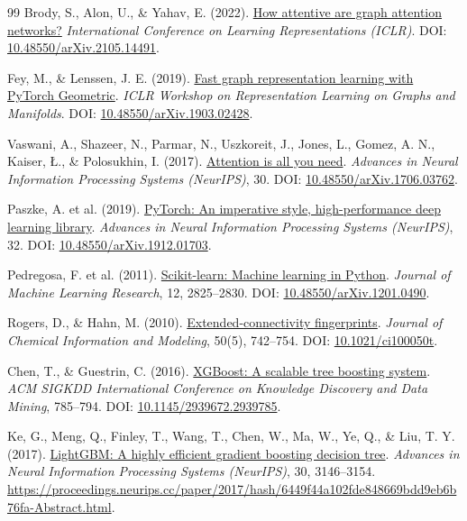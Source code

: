 \documentclass[11pt]{article}
\begin{document}
\begin{thebibliography}{99}
 Brody, S., Alon, U., \& Yahav, E. (2022). \href{https://openreview.net/forum?id=F72ximsx7C1}{How attentive are graph attention networks?} \textit{International Conference on Learning Representations (ICLR)}. DOI: \href{https://doi.org/10.48550/arXiv.2105.14491}{10.48550/arXiv.2105.14491}.

 Fey, M., \& Lenssen, J. E. (2019). \href{https://arxiv.org/abs/1903.02428}{Fast graph representation learning with PyTorch Geometric}. \textit{ICLR Workshop on Representation Learning on Graphs and Manifolds}. DOI: \href{https://doi.org/10.48550/arXiv.1903.02428}{10.48550/arXiv.1903.02428}.

 Vaswani, A., Shazeer, N., Parmar, N., Uszkoreit, J., Jones, L., Gomez, A. N., Kaiser, {\L}., \& Polosukhin, I. (2017). \href{https://proceedings.neurips.cc/paper/2017/hash/3f5ee243547dee91fbd053c1c4a845aa-Abstract.html}{Attention is all you need}. \textit{Advances in Neural Information Processing Systems (NeurIPS)}, 30. DOI: \href{https://doi.org/10.48550/arXiv.1706.03762}{10.48550/arXiv.1706.03762}.

 Paszke, A. et al. (2019). \href{https://proceedings.neurips.cc/paper/2019/hash/bdbca288fee7f92f2bfa9f7012727740-Abstract.html}{PyTorch: An imperative style, high-performance deep learning library}. \textit{Advances in Neural Information Processing Systems (NeurIPS)}, 32. DOI: \href{https://doi.org/10.48550/arXiv.1912.01703}{10.48550/arXiv.1912.01703}.

 Pedregosa, F. et al. (2011). \href{https://jmlr.org/papers/v12/pedregosa11a.html}{Scikit-learn: Machine learning in Python}. \textit{Journal of Machine Learning Research}, 12, 2825--2830. DOI: \href{https://doi.org/10.48550/arXiv.1201.0490}{10.48550/arXiv.1201.0490}.

 Rogers, D., \& Hahn, M. (2010). \href{https://doi.org/10.1021/ci100050t}{Extended-connectivity fingerprints}. \textit{Journal of Chemical Information and Modeling}, 50(5), 742--754. DOI: \href{https://doi.org/10.1021/ci100050t}{10.1021/ci100050t}.

 Chen, T., \& Guestrin, C. (2016). \href{https://doi.org/10.1145/2939672.2939785}{XGBoost: A scalable tree boosting system}. \textit{ACM SIGKDD International Conference on Knowledge Discovery and Data Mining}, 785--794. DOI: \href{https://doi.org/10.1145/2939672.2939785}{10.1145/2939672.2939785}.

 Ke, G., Meng, Q., Finley, T., Wang, T., Chen, W., Ma, W., Ye, Q., \& Liu, T. Y. (2017). \href{https://proceedings.neurips.cc/paper/2017/hash/6449f44a102fde848669bdd9eb6b76fa-Abstract.html}{LightGBM: A highly efficient gradient boosting decision tree}. \textit{Advances in Neural Information Processing Systems (NeurIPS)}, 30, 3146--3154. \url{https://proceedings.neurips.cc/paper/2017/hash/6449f44a102fde848669bdd9eb6b76fa-Abstract.html}.


\end{thebibliography}
\end{document}
